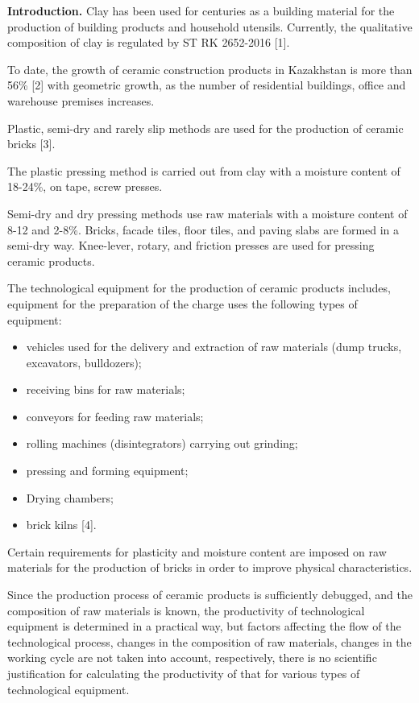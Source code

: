 \begin{multicols}{2}

{\bfseries Introduction.} Clay has been used for centuries as a building
material for the production of building products and household utensils.
Currently, the qualitative composition of clay is regulated by ST RK
2652-2016 {[}1{]}.

To date, the growth of ceramic construction products in Kazakhstan is
more than 56\% {[}2{]} with geometric growth, as the number of
residential buildings, office and warehouse premises increases.

Plastic, semi-dry and rarely slip methods are used for the production of
ceramic bricks {[}3{]}.

The plastic pressing method is carried out from clay with a moisture
content of 18-24\%, on tape, screw presses.

Semi-dry and dry pressing methods use raw materials with a moisture
content of 8-12 and 2-8\%. Bricks, facade tiles, floor tiles, and paving
slabs are formed in a semi-dry way. Knee-lever, rotary, and friction
presses are used for pressing ceramic products.

The technological equipment for the production of ceramic products
includes, equipment for the preparation of the charge uses the following
types of equipment:

\begin{itemize}
	\setlength{\itemindent}{1cm} 
	\item
	vehicles used for the delivery and extraction of raw materials (dump trucks, excavators, bulldozers);
	\item
	receiving bins for raw materials;
	\item
	conveyors for feeding raw materials;
	\item
	rolling machines (disintegrators) carrying out grinding;
	\item
	pressing and forming equipment;
	\item
	Drying chambers;
	\item
	brick kilns {[}4{]}.
\end{itemize}

Certain requirements for plasticity and moisture content are imposed on
raw materials for the production of bricks in order to improve physical
characteristics.

Since the production process of ceramic products is sufficiently
debugged, and the composition of raw materials is known, the
productivity of technological equipment is determined in a practical
way, but factors affecting the flow of the technological process,
changes in the composition of raw materials, changes in the working
cycle are not taken into account, respectively, there is no scientific
justification for calculating the productivity of that for various types
of technological equipment.


\end{multicols}
